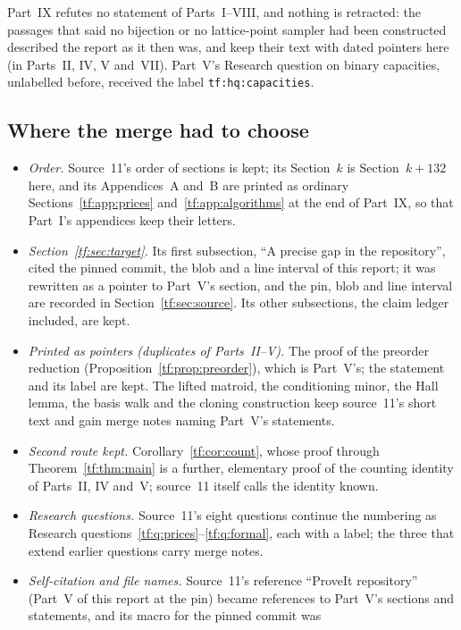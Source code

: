 \documentclass[11pt]{article}
\numberwithin{equation}{section}
\theoremstyle{definition}
\begin{document}
Part~IX refutes no statement of Parts~I--VIII, and nothing is retracted:
the passages that said no bijection or no lattice-point sampler had been
constructed described the report as it then was, and keep their text with
dated pointers here (in Parts~II, IV, V and~VII). Part~V's Research
question on binary capacities, unlabelled before, received the label
\texttt{tf:hq:capacities}.

\subsection{Where the merge had to choose}
\label{tf:sec:merge}
\begin{itemize}[leftmargin=1.4em]
\item \emph{Order.} Source~11's order of sections is kept; its
Section~$k$ is Section~$k+132$ here, and its Appendices~A and~B are
printed as ordinary Sections~\ref{tf:app:prices}
and~\ref{tf:app:algorithms} at the end of Part~IX, so that Part~I's
appendices keep their letters.
\item \emph{Section~\ref{tf:sec:target}.} Its first subsection, ``A precise
gap in the repository'', cited the pinned commit, the blob and a line
interval of this report; it was rewritten as a pointer to Part~V's
section, and the pin, blob and line interval are recorded in
Section~\ref{tf:sec:source}. Its other subsections, the claim ledger
included, are kept.
\item \emph{Printed as pointers (duplicates of Parts~II--V).} The proof of
the preorder reduction (Proposition~\ref{tf:prop:preorder}), which is
Part~V's; the statement and its label are kept. The lifted matroid, the
conditioning minor, the Hall lemma, the basis walk and the cloning
construction keep source~11's short text and gain merge notes naming
Part~V's statements.
\item \emph{Second route kept.} Corollary~\ref{tf:cor:count}, whose proof
through Theorem~\ref{tf:thm:main} is a further, elementary proof of the
counting identity of Parts~II, IV and~V; source~11 itself calls the
identity known.
\item \emph{Research questions.} Source~11's eight questions continue the
numbering as Research questions~\ref{tf:q:prices}--\ref{tf:q:formal}, each
with a label; the three that extend earlier questions carry merge notes.
\item \emph{Self-citation and file names.} Source~11's reference ``ProveIt
repository'' (Part~V of this report at the pin) became references to
Part~V's sections and statements, and its macro for the pinned commit was

\end{itemize}
\end{document}
